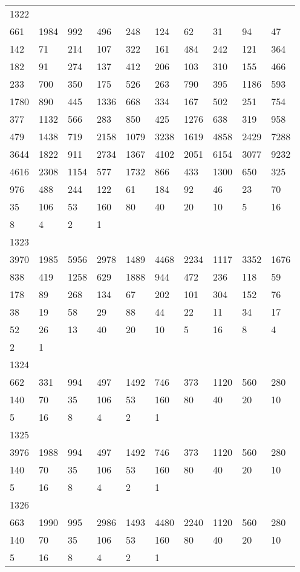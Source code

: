 \begin{longtable}{*{10}{l}}
1322&&&&&&&&&\\
661& 1984& 992& 496& 248& 124& 62& 31& 94& 47\\
142& 71& 214& 107& 322& 161& 484& 242& 121& 364\\
182& 91& 274& 137& 412& 206& 103& 310& 155& 466\\
233& 700& 350& 175& 526& 263& 790& 395& 1186& 593\\
1780& 890& 445& 1336& 668& 334& 167& 502& 251& 754\\
377& 1132& 566& 283& 850& 425& 1276& 638& 319& 958\\
479& 1438& 719& 2158& 1079& 3238& 1619& 4858& 2429& 7288\\
3644& 1822& 911& 2734& 1367& 4102& 2051& 6154& 3077& 9232\\
4616& 2308& 1154& 577& 1732& 866& 433& 1300& 650& 325\\
976& 488& 244& 122& 61& 184& 92& 46& 23& 70\\
35& 106& 53& 160& 80& 40& 20& 10& 5& 16\\
8& 4& 2& 1& \\

1323&&&&&&&&&\\
3970& 1985& 5956& 2978& 1489& 4468& 2234& 1117& 3352& 1676\\
838& 419& 1258& 629& 1888& 944& 472& 236& 118& 59\\
178& 89& 268& 134& 67& 202& 101& 304& 152& 76\\
38& 19& 58& 29& 88& 44& 22& 11& 34& 17\\
52& 26& 13& 40& 20& 10& 5& 16& 8& 4\\
2& 1& \\

1324&&&&&&&&&\\
662& 331& 994& 497& 1492& 746& 373& 1120& 560& 280\\
140& 70& 35& 106& 53& 160& 80& 40& 20& 10\\
5& 16& 8& 4& 2& 1& \\

1325&&&&&&&&&\\
3976& 1988& 994& 497& 1492& 746& 373& 1120& 560& 280\\
140& 70& 35& 106& 53& 160& 80& 40& 20& 10\\
5& 16& 8& 4& 2& 1& \\

1326&&&&&&&&&\\
663& 1990& 995& 2986& 1493& 4480& 2240& 1120& 560& 280\\
140& 70& 35& 106& 53& 160& 80& 40& 20& 10\\
5& 16& 8& 4& 2& 1& \\


\end{longtable}
